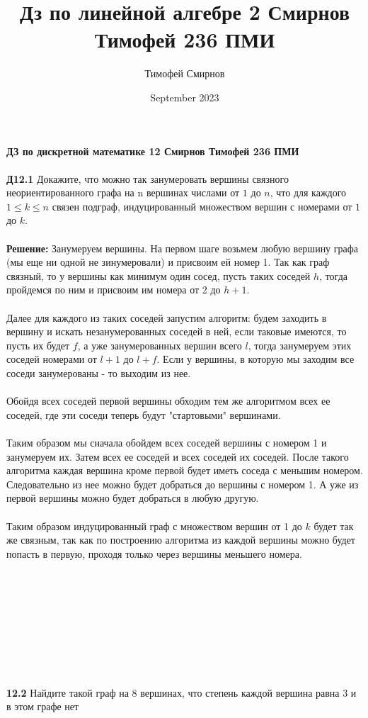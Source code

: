 \documentclass[a4paper, 12pt]{article}
\title{Дз по линейной алгебре 2 Смирнов Тимофей 236 ПМИ}
\author{Тимофей Смирнов}
\date{September 2023}
\begin{document}
    {\center \bf \large ДЗ по дискретной математике 12 Смирнов Тимофей 236 ПМИ}
    \\
    \\ \textbf{Д12.1} Докажите, что можно так занумеровать вершины связного неориентированного графа на n
    вершинах числами от $1$ до $n$, что для каждого $1 \leq k \leq n$ связен подграф, индуцированный множеством
    вершин с номерами от $1$ до $k$.
    \\
    \\ \textbf{Решение: } Занумеруем вершины. На первом шаге возьмем любую вершину графа (мы еще ни одной не зинумеровали) и присвоим ей номер 1. Так как граф связный, то у вершины как минимум один сосед, пусть таких соседей $h$, тогда пройдемся по ним и присвоим им номера от 2 до $h + 1$. 
    \\
    \\ Далее для каждого из таких соседей запустим алгоритм: будем заходить в вершину и искать незанумерованных соседей в ней, если таковые имеются, то пусть их будет $f$, а уже занумерованных вершин всего $l$, тогда занумеруем этих соседей номерами от $l + 1$ до $l + f$. Если у вершины, в которую мы заходим все соседи занумерованы - то выходим из нее.
    \\
    \\ Обойдя всех соседей первой вершины обходим тем же алгоритмом всех ее соседей, где эти соседи теперь будут "стартовыми" вершинами.
    \\
    \\ Таким образом мы сначала обойдем всех соседей вершины с номером 1 и занумеруем их. Затем всех ее соседей и всех соседей их соседей. После такого алгоритма каждая вершина кроме первой будет иметь соседа с меньшим номером. Следовательно из нее можно будет добраться до вершины с номером 1. А уже из первой вершины можно будет добраться в любую другую.
    \\
    \\ Таким образом индуцированный граф с множеством вершин от 1 до $k$ будет так же связным, так как по построению алгоритма из каждой вершины можно будет попасть в первую, проходя только через вершины меньшего номера.
    \\
    \\ \\ \\ 
    \\ \\ \\ \\ \\ \\ \textbf{12.2} Найдите такой граф на 8 вершинах, что степень каждой вершина равна 3 и в этом графе нет
\end{document}
